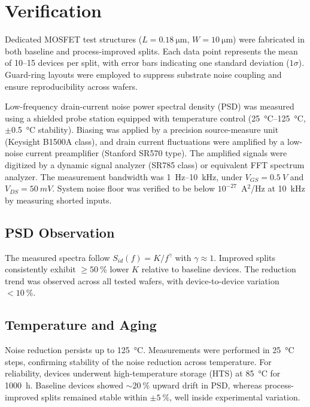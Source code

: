 \documentclass[conference]{IEEEtran}
\begin{document}
\section{Verification}
Dedicated MOSFET test structures ($L=\SI{0.18}{\micro\meter}$, $W=\SI{10}{\micro\meter}$) were fabricated in both baseline and process-improved splits. Each data point represents the mean of 10--15 devices per split, with error bars indicating one standard deviation ($1\sigma$). Guard-ring layouts were employed to suppress substrate noise coupling and ensure reproducibility across wafers.

Low-frequency drain-current noise power spectral density (PSD) was measured using a shielded probe station equipped with temperature control (\SIrange{25}{125}{\celsius}, $\pm$\SI{0.5}{\celsius} stability). Biasing was applied by a precision source-measure unit (Keysight B1500A class), and drain current fluctuations were amplified by a low-noise current preamplifier (Stanford SR570 type). The amplified signals were digitized by a dynamic signal analyzer (SR785 class) or equivalent FFT spectrum analyzer. The measurement bandwidth was \SI{1}{\hertz}–\SI{10}{\kilo\hertz}, under $V_{GS}=\SI{0.5}{V}$ and $V_{DS}=\SI{50}{mV}$. System noise floor was verified to be below $10^{-27}$~A$^{2}$/Hz at \SI{10}{\kilo\hertz} by measuring shorted inputs.

\subsection{PSD Observation}
The measured spectra follow $S_{id}(f)=K/f^{\gamma}$ with $\gamma\approx 1$. Improved splits consistently exhibit $\geq\SI{50}{\percent}$ lower $K$ relative to baseline devices. The reduction trend was observed across all tested wafers, with device-to-device variation $<\SI{10}{\percent}$.

\subsection{Temperature and Aging}
Noise reduction persists up to \SI{125}{\celsius}. Measurements were performed in \SI{25}{\celsius} steps, confirming stability of the noise reduction across temperature. For reliability, devices underwent high-temperature storage (HTS) at \SI{85}{\celsius} for 1000~h. Baseline devices showed $\sim\SI{20}{\percent}$ upward drift in PSD, whereas process-improved splits remained stable within $\pm\SI{5}{\percent}$, well inside experimental variation.
\end{document}
